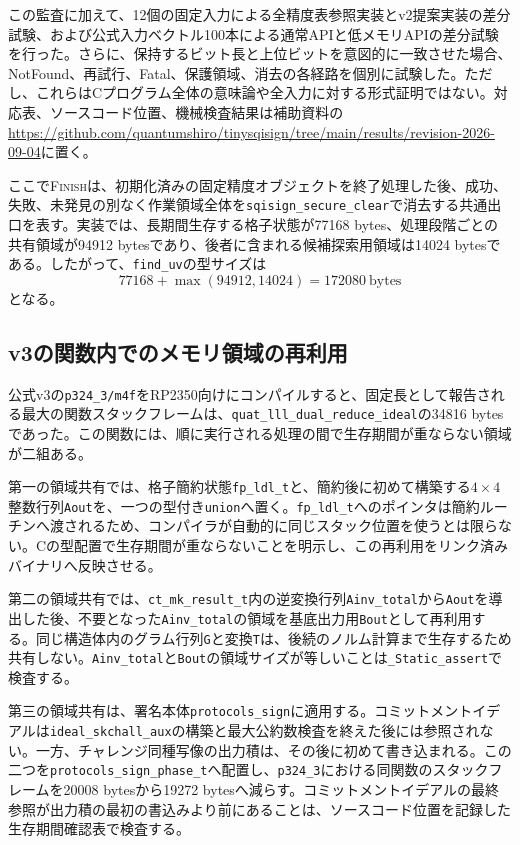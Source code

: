 \documentclass[a4paper,10pt]{ltjsarticle}
\theoremstyle{definition}
\theoremstyle{remark}
\begin{document}
この監査に加えて、12個の固定入力による全精度表参照実装とv2提案実装の差分試験、および公式入力ベクトル100本による通常APIと低メモリAPIの差分試験を行った。さらに、保持するビット長と上位ビットを意図的に一致させた場合、NotFound、再試行、Fatal、保護領域、消去の各経路を個別に試験した。ただし、これらはCプログラム全体の意味論や全入力に対する形式証明ではない。対応表、ソースコード位置、機械検査結果は補助資料の\url{https://github.com/quantumshiro/tinysqisign/tree/main/results/revision-2026-09-04}に置く。

ここで\textsc{Finish}は、初期化済みの固定精度オブジェクトを終了処理した後、成功、失敗、未発見の別なく作業領域全体を\texttt{sqisign\_secure\_clear}で消去する共通出口を表す。実装では、長期間生存する格子状態が\num{77168} bytes、処理段階ごとの共有領域が\num{94912} bytesであり、後者に含まれる候補探索用領域は\num{14024} bytesである。したがって、\texttt{find\_uv}の型サイズは
\begin{equation}
  \num{77168}+\max(\num{94912},\num{14024})
  =\num{172080}\ \text{bytes}
  \label{eq:finduv-size}
\end{equation}
となる。

\subsection{v3の関数内でのメモリ領域の再利用}
\label{sec:v3-method}

公式v3の\texttt{p324\_3/m4f}をRP2350向けにコンパイルすると、固定長として報告される最大の関数スタックフレームは、\texttt{quat\_lll\_dual\_reduce\_ideal}の\num{34816} bytesであった。この関数には、順に実行される処理の間で生存期間が重ならない領域が二組ある。

第一の領域共有では、格子簡約状態\texttt{fp\_ldl\_t}と、簡約後に初めて構築する$4\times4$整数行列\texttt{Aout}を、一つの型付き\texttt{union}へ置く。\texttt{fp\_ldl\_t}へのポインタは簡約ルーチンへ渡されるため、コンパイラが自動的に同じスタック位置を使うとは限らない。Cの型配置で生存期間が重ならないことを明示し、この再利用をリンク済みバイナリへ反映させる。

第二の領域共有では、\texttt{ct\_mk\_result\_t}内の逆変換行列\texttt{Ainv\_total}から\texttt{Aout}を導出した後、不要となった\texttt{Ainv\_total}の領域を基底出力用\texttt{Bout}として再利用する。同じ構造体内のグラム行列\texttt{G}と変換\texttt{T}は、後続のノルム計算まで生存するため共有しない。\texttt{Ainv\_total}と\texttt{Bout}の領域サイズが等しいことは\texttt{\_Static\_assert}で検査する。

第三の領域共有は、署名本体\texttt{protocols\_sign}に適用する。コミットメントイデアルは\texttt{ideal\_skchall\_aux}の構築と最大公約数検査を終えた後には参照されない。一方、チャレンジ同種写像の出力積は、その後に初めて書き込まれる。この二つを\texttt{protocols\_sign\_phase\_t}へ配置し、\texttt{p324\_3}における同関数のスタックフレームを\num{20008} bytesから\num{19272} bytesへ減らす。コミットメントイデアルの最終参照が出力積の最初の書込みより前にあることは、ソースコード位置を記録した生存期間確認表で検査する。
\end{document}
